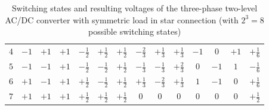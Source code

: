 \begin{frame}[b]
\begin{table}
\begin{tabular}{c c c c c c c c c c c c c c}
			$4$            & $-1$           & $+1$           & $+1$           & $-\frac{1}{2}$                 & $+\frac{1}{2}$                 & $+\frac{1}{2}$                 & $-\frac{2}{3}$                & $+\frac{1}{3}$                & $+\frac{1}{3}$                & $-1$                          & $0$                           & $+1$                          & $+\frac{1}{6}$                \\

			$5$            & $-1$           & $-1$           & $+1$           & $-\frac{1}{2}$                 & $-\frac{1}{2}$                 & $+\frac{1}{2}$                 & $-\frac{1}{3}$                & $-\frac{1}{3}$                & $+\frac{2}{3}$                & $0$                           & $-1$                          & $1$                           & $-\frac{1}{6}$                \\

			$6$            & $+1$           & $-1$           & $+1$           & $+\frac{1}{2}$                 & $-\frac{1}{2}$                 & $+\frac{1}{2}$                 & $+\frac{1}{3}$                & $-\frac{2}{3}$                & $+\frac{1}{3}$                & $1$                           & $-1$                          & $0$                           & $+\frac{1}{6}$                \\

			$7$            & $+1$           & $+1$           & $+1$           & $+\frac{1}{2}$                 & $+\frac{1}{2}$                 & $+\frac{1}{2}$                 & $0$                           & $0$                           & $0$                           & $0$                           & $0$                           & $0$                           & $+\frac{1}{2}$                \\

			\bottomrule
		\end{tabular}
		\caption{Switching states and resulting voltages of the three-phase two-level AC/DC converter with symmetric load in star connection (with $2^3=8$ possible switching states)}
		\label{tab:VSI_three_phase_two_level_bridge_converter_load_star}
	\end{table}
\end{frame}

